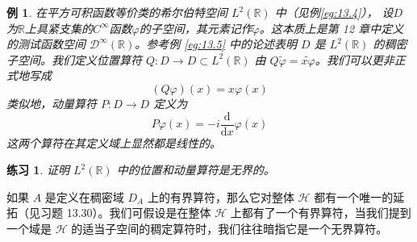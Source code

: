 \documentclass[hyperref,UTF8]{ctexbook}
\newtheorem{eg}{例}[chapter]
\newtheorem*{exercise}{练习}
\begin{document}
\begin{eg}\label{eg:13.17}
    在平方可积函数等价类的希尔伯特空间 \(L^{2}(\mathbb{R})\) 中（见例\ref{eg:13.4}）， 设\(D\)为\(\mathbb{R}\)上具紧支集的\(C^{\infty}\)函数\(\varphi\)的子空间，其元素记作\(\widetilde{\varphi}\)。这本质上是第 12 章中定义的测试函数空间 \(\mathcal{D}^{\infty}(\mathbb{R})\)。参考例 \ref{eg:13.5} 中的论述表明 \(D\) 是 \(L^{2}(\mathbb{R})\) 的稠密子空间。我们定义位置算符 \(Q: D \rightarrow D \subset L^{2}(\mathbb{R}) \) 由 \(Q \widetilde{\varphi}=\widetilde{x \varphi}\)。我们可以更非正式地写成
\[
(Q \varphi)(x)=x \varphi(x) 
\]
类似地，动量算符 \(P: D \rightarrow D\) 定义为
\[
P \varphi(x)=-i \frac{\mathrm{d}}{\mathrm{d} x} \varphi(x)
\]
这两个算符在其定义域上显然都是线性的。
\end{eg}
\begin{exercise}
    证明 \(L^{2}(\mathbb{R})\) 中的位置和动量算符是无界的。
\end{exercise}
如果 \(A\) 是定义在稠密域 \(D_{A}\) 上的有界算符，那么它对整体 \(\mathcal{H}\) 都有一个唯一的延拓（见习题 13.30）。我们可假设是在整体 \(\mathcal{H}\) 上都有了一个有界算符，当我们提到一个域是 \(\mathcal{H}\) 的适当子空间的稠定算符时，我们往往暗指它是一个无界算符。
\end{document}
